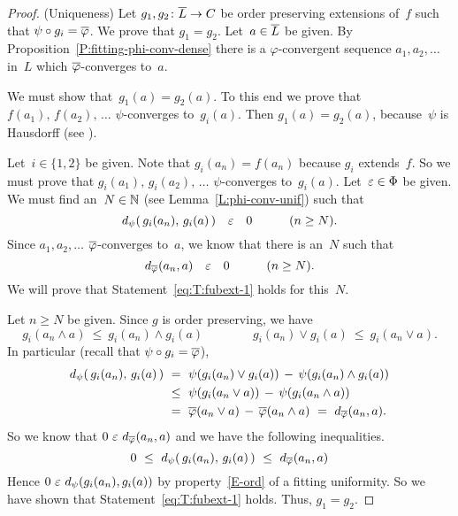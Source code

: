 \documentclass[main.tex]{subfiles}
\begin{document}
\begin{proof}
(Uniqueness)
Let $g_1,g_2\colon \overline L \rightarrow C$
be order preserving extensions of~$f$ such that
$\psi\circ g_i = \overline\varphi$.
We prove that $g_1 = g_2$.
Let~$a\in \overline L$ be given.
By Proposition~\ref{P:fitting-phi-conv-dense}
there is a $\varphi$-convergent sequence $a_1,a_2,\dotsc$
in~$L$ which $\overline\varphi$-converges to~$a$.

We must show that~$g_1(a) = g_2(a)$.
To this end we prove that $f(a_1),\,f(a_2),\,\dotsc$
$\psi$-converges to~$g_i(a)$.
Then $g_1(a) = g_2(a)$, because~$\psi$ is Hausdorff
(see ).

Let~$i\in\{1,2\}$ be given.
Note that $g_i(a_n) = f(a_n)$ because $g_i$ extends~$f$.
So we must prove that $g_i(a_1),\,g_i(a_2),\,\dotsc$
$\psi$-converges to~$g_i(a)$.
Let~$\varepsilon\in\Phi$ be given.
We must find 
an~$N\in \mathbb{N}$ (see Lemma~\ref{L:phi-conv-unif})
such that
\begin{equation}
\label{eq:T:fubext-1}
d_{\smash{\psi}}(\,g_i(a_n),\,g_i(a)\,) \quad\varepsilon\quad 0
\qquad\quad(n\geq N).
\end{equation}
Since $a_1,a_2,\dotsc$ $\overline\varphi$-converges to~$a$,
we know that there is an~$N$ such that 
\begin{equation*}
d_{\smash{\overline\varphi}}(a_n,a) \quad\varepsilon\quad 0\qquad\quad(n\geq N).
\end{equation*}
We will prove that Statement~\eqref{eq:T:fubext-1}
holds for this~$N$.

Let $n\geq N$ be given.
Since $g$ is order preserving, we have
\begin{equation*}
g_i(a_n \wedge a) \ \leq\ g_i(a_n)\wedge g_i(a)
\qquad\qquad
g_i(a_n) \vee g_i(a) \ \leq\  g_i (a_n \vee a).
\end{equation*}
In particular
(recall that $\psi\circ g_i=\overline\varphi$),
\begin{equation}
\label{eq:T-fubext-3}
\begin{alignedat}{3}
\ld\psi(\,g_i(a_n),\,g_i(a)\,) 
\ &=\ 
\psi(g_i(a_n) \vee g_i(a)) \,-\, \psi(g_i(a_n)\wedge g_i(a)) \\
\ &\leq\ 
\psi(g_i(a_n\vee a)) \,-\, \psi(g_i(a_n \wedge a)) \\
\ &=\ 
\ol\varphi(a_n \vee a) \,-\, \ol\varphi(a_n\wedge a) 
\ =\ \ld{\ol\varphi}(a_n,a).
\end{alignedat}
\end{equation}
So we
know that $0\ \ve\ \ld{\ol\varphi}(a_n,a)$
and we have the following inequalities.
\begin{equation*}
0 \ \leq\ \ld{\psi}(\,g_i(a_n),\,g_i(a)\,) \ \leq\ \ld{\ol\varphi}(a_n,a)
\end{equation*}
Hence $0 \ \ve\ \ld{\psi}(g_i(a_n),g_i(a))$
by property~\ref{E-ord} of a fitting uniformity.
So we have shown that Statement~\eqref{eq:T:fubext-1} holds.
Thus, $g_1=g_2$.


\end{proof}
\end{document}
